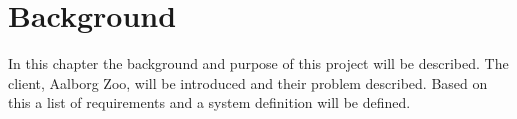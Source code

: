\chapter{Background} \label{ch:background}
In this chapter the background and purpose of this project will be described. The client, Aalborg Zoo, will be introduced and their problem described. Based on this a list of requirements and a system definition will be defined. 